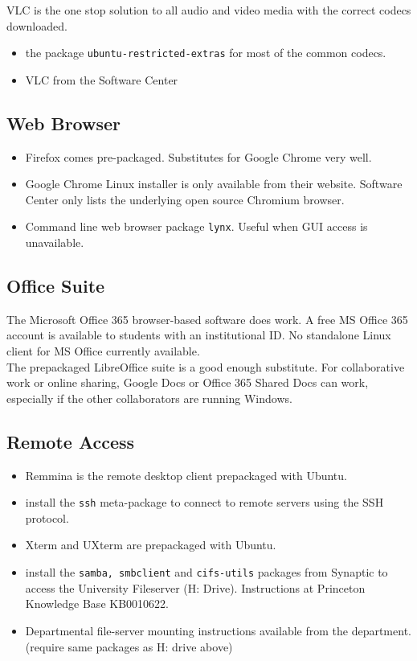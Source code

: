 \documentclass[10pt,letterpaper,twocolumn]{article}
\begin{document}
VLC is the one stop solution to all audio and video media with the correct codecs downloaded.

\begin{itemize}
	\item the package \texttt{ubuntu-restricted-extras} for most of the common codecs.
	\item VLC from the Software Center
\end{itemize}

\subsection{Web Browser}

\begin{itemize}
	\item Firefox comes pre-packaged. Substitutes for Google Chrome very well.
	\item Google Chrome Linux installer is only available from their website. Software Center only lists the underlying open source Chromium browser.
	\item Command line web browser package \texttt{lynx}. Useful when GUI access is unavailable.
	
\end{itemize}

\subsection{Office Suite}

The Microsoft Office 365 browser-based software does work. A free MS Office 365 account is available to students with an institutional ID. No standalone Linux client for MS Office currently available. \\

The prepackaged LibreOffice suite is a good enough substitute. For collaborative work or online sharing, Google Docs or Office 365 Shared Docs can work, especially if the other collaborators are running Windows.

\subsection{Remote Access}

\begin{itemize}
	\item Remmina is the remote desktop client prepackaged with Ubuntu.
	\item install the \texttt{ssh} meta-package to connect to remote servers using the SSH protocol.
	\item Xterm and UXterm are prepackaged with Ubuntu.
	\item install the \texttt{samba, smbclient} and \texttt{cifs-utils} packages from Synaptic to access the University Fileserver (H: Drive). Instructions at Princeton Knowledge Base KB0010622.
	\item Departmental file-server mounting instructions available from the department. (require same packages as H: drive above)
	 
\end{itemize}
\end{document}
